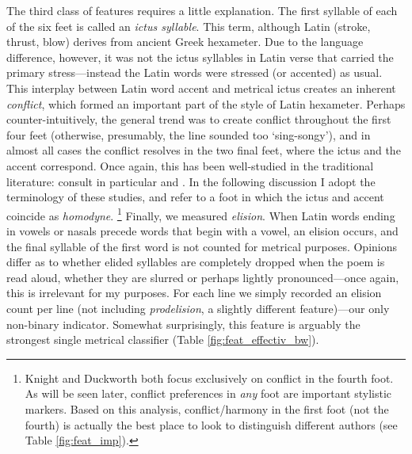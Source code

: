 \documentclass[11pt,a4paper]{scrartcl} %
\begin{document}
{The third class of features requires a little explanation. The first syllable of each of the six feet is called an \textit{ictus syllable}. This term, although Latin (stroke, thrust, blow) derives from ancient Greek hexameter. Due to the language difference, however, it was not the ictus syllables in Latin verse that carried the primary stress---instead the Latin words were stressed (or accented) as usual. This interplay between Latin word accent and metrical ictus creates an inherent \textit{conflict}, which formed an important part of the style of Latin hexameter. Perhaps counter-intuitively, the general trend was to create conflict throughout the first four feet (otherwise, presumably, the line sounded too `sing-songy'), and in almost all cases the conflict resolves in the two final feet, where the ictus and the accent correspond. Once again, this has been well-studied in the traditional literature: consult in particular  and . In the following discussion I adopt the terminology of these studies, and refer to a foot in which the ictus and accent coincide as \textit{homodyne}.%
\footnote{Knight and Duckworth both focus exclusively on conflict in the fourth foot. As will be seen later, conflict preferences in \textit{any} foot are important stylistic markers. Based on this analysis, conflict/harmony in the first foot (not the fourth) is actually the best place to look to distinguish different authors (see Table \ref{fig:feat_imp}).}
Finally, we measured \textit{elision}. When Latin words ending in vowels or nasals precede words that begin with a vowel, an elision occurs, and the final syllable of the first word is not counted for metrical purposes. Opinions differ as to whether elided syllables are completely dropped when the poem is read aloud, whether they are slurred or perhaps lightly pronounced---once again, this is irrelevant for my purposes. For each line we simply recorded an elision count per line (not including \textit{prodelision}, a slightly different feature)---our only non-binary indicator. Somewhat surprisingly, this feature is arguably the strongest single metrical classifier (Table \ref{fig:feat_effectiv_bw}).

}
\end{document}
